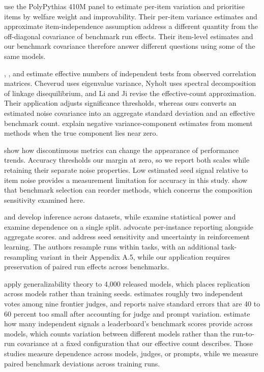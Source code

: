 \citet{haupt2026} use the PolyPythias 410M panel to estimate per-item variation and prioritise items by welfare weight and improvability. Their per-item variance estimates and approximate item-independence assumption address a different quantity from the off-diagonal covariance of benchmark run effects. Their item-level estimates and our benchmark covariance therefore answer different questions using some of the same models.

\citet{cheverud2001}, \citet{nyholt2004}, and \citet{li2005} estimate effective numbers of independent tests from observed correlation matrices. Cheverud uses eigenvalue variance, Nyholt uses spectral decomposition of linkage disequilibrium, and Li and Ji revise the effective-count approximation. Their application adjusts significance thresholds, whereas ours converts an estimated noise covariance into an aggregate standard deviation and an effective benchmark count. \citet{searle1992} explain negative variance-component estimates from moment methods when the true component lies near zero.

\citet{schaeffer2023} show how discontinuous metrics can change the appearance of performance trends. Accuracy thresholds our margin at zero, so we report both scales while retaining their separate noise properties. Low estimated seed signal relative to item noise provides a measurement limitation for accuracy in this study. \citet{dehghani2021} show that benchmark selection can reorder methods, which concerns the composition sensitivity examined here.

\citet{demsar2006} and \citet{dror2017} develop inference across datasets, while \citet{card2020} examine statistical power and \citet{gorman2019} examine dependence on a single split. \citet{burnell2023} advocate per-instance reporting alongside aggregate scores. \citet{henderson2018} and \citet{agarwal2021} address seed sensitivity and uncertainty in reinforcement learning. The authors resample runs within tasks, with an additional task-resampling variant in their Appendix A.5, while our application requires preservation of paired run effects across benchmarks.

\citet{hardy2026} apply generalizability theory to 4,000 released models, which places replication across models rather than training seeds. \citet{kohli2026} estimates roughly two independent votes among nine frontier judges, and \citet{messing2026} reports naive standard errors that are 40 to 60 percent too small after accounting for judge and prompt variation. \citet{sha2026} estimate how many independent signals a leaderboard's benchmark scores provide across models, which counts variation between different models rather than the run-to-run covariance at a fixed configuration that our effective count describes. Those studies measure dependence across models, judges, or prompts, while we measure paired benchmark deviations across training runs.

